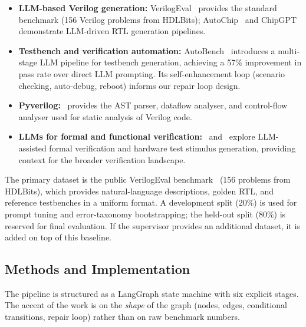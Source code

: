 \documentclass[11pt,a4paper, titlepage=false]{scrreprt}
\begin{document}
\begin{itemize}
    \item \textbf{LLM-based Verilog generation:} VerilogEval~\cite{liu2023verilogeval} provides
    the standard benchmark (156 Verilog problems from HDLBits); AutoChip~\cite{thakur2023autochip}
    and ChipGPT~\cite{chang2023chipgpt} demonstrate LLM-driven RTL generation pipelines.

    \item \textbf{Testbench and verification automation:} AutoBench~\cite{qiu2024autobench}
    introduces a multi-stage LLM pipeline for testbench generation, achieving a 57\% improvement
    in pass rate over direct LLM prompting. Its self-enhancement loop (scenario checking,
    auto-debug, reboot) informs our repair loop design.

    \item \textbf{Pyverilog:}~\cite{takamaeda2015pyverilog} provides the AST parser, dataflow
    analyser, and control-flow analyser used for static analysis of Verilog code.

    \item \textbf{LLMs for formal and functional verification:}~\cite{orenes2023llmformal}
    and~\cite{zhang2023llm4dv} explore LLM-assisted formal verification and hardware test
    stimulus generation, providing context for the broader verification landscape.
\end{itemize}

The primary dataset is the public VerilogEval benchmark~\cite{liu2023verilogeval} (156 problems
from HDLBits), which provides natural-language descriptions, golden RTL, and reference
testbenches in a uniform format. A development split (20\%) is used for prompt tuning and
error-taxonomy bootstrapping; the held-out split (80\%) is reserved for final evaluation. If
the supervisor provides an additional dataset, it is added on top of this baseline.

\subsection*{Methods and Implementation}

The pipeline is structured as a LangGraph state machine with six explicit stages. The accent of
the work is on the \emph{shape} of the graph (nodes, edges, conditional transitions, repair
loop) rather than on raw benchmark numbers.
\end{document}
